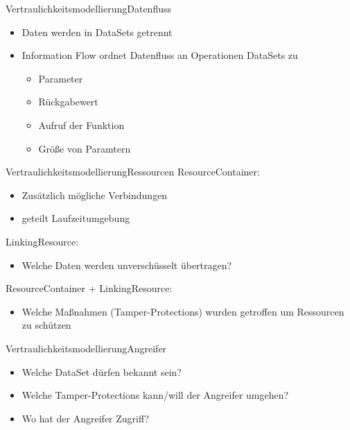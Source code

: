 \documentclass{sdqbeamer}
\begin{document}
\begin{frame}{Vertraulichkeitsmodellierung}{Datenfluss}
	\begin{itemize}
		\item Daten werden in DataSets getrennt
		\item Information Flow ordnet Datenfluss an Operationen DataSets zu
		\begin{itemize}
			\item Parameter
			\item Rückgabewert
			\item Aufruf der Funktion
			\item Größe von Paramtern
		\end{itemize}
	\end{itemize}

\end{frame}	
\begin{frame}{Vertraulichkeitsmodellierung}{Ressourcen}
ResourceContainer:
	\begin{itemize}
		\item Zusätzlich mögliche Verbindungen
		\item geteilt Laufzeitumgebung
	\end{itemize}
LinkingResource:
	\begin{itemize}
		\item Welche Daten werden unverschüsselt übertragen?
	\end{itemize}
ResourceContainer + LinkingResource:
\begin{itemize}
	\item Welche Maßnahmen (Tamper-Protections) wurden getroffen um Ressourcen zu schützen
\end{itemize}
\end{frame}	
\begin{frame}{Vertraulichkeitsmodellierung}{Angreifer}
	\begin{itemize}
		\item Welche DataSet dürfen bekannt sein?
		\item Welche Tamper-Protections kann/will der Angreifer umgehen?
		\item Wo hat der Angreifer Zugriff?
	\end{itemize}
\end{frame}	
\end{document}
